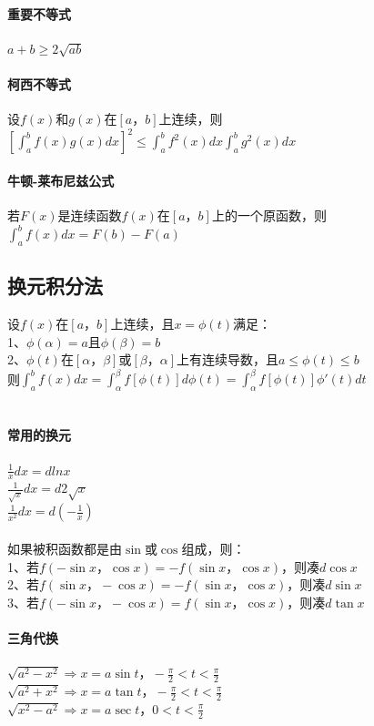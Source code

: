 \documentclass{article}
\begin{document}
\begin{flushleft}
	\paragraph{重要不等式}
	$a+b\ge 2\sqrt{ab}$\\
	\paragraph{柯西不等式}
	设$f(x)$和$g(x)$在$[a，b]$上连续，则$[\int_{a}^{b}f(x)g(x)dx]^2\le \int_{a}^{b}f^2(x)dx\int_{a}^{b}g^2(x)dx$\\
	\paragraph{牛顿-莱布尼兹公式}
	若$F(x)$是连续函数$f(x)$在$[a，b]$上的一个原函数，则$\int_{a}^{b}f(x)dx=F(b)-F(a)$\\
	
	\subsection{换元积分法}
	
	设$f(x)$在$[a，b]$上连续，且$x=\phi(t)$满足：\\
	1、$\phi(\alpha)=a$且$\phi(\beta)=b$\\
	2、$\phi(t)$在$[\alpha，\beta]$或$[\beta，\alpha]$上有连续导数，且$a\le \phi(t)\le b$\\
	则$\int_{a}^{b}f(x)dx=\int_{\alpha}^{\beta}f[\phi(t)]d\phi(t)=\int_{\alpha}^{\beta}f[\phi(t)]\phi'(t)dt$\\
	~\\
	\paragraph{常用的换元}
	$\frac{1}{x}dx=dlnx$\\
	$\frac{1}{\sqrt{x}}dx=d2\sqrt{x}$\\
	$\frac{1}{x^2}dx=d(-\frac{1}{x})$\\
	~\\
	如果被积函数都是由$\sin$或$\cos$组成，则：\\
	1、若$f(-\sin x，\cos x)=-f(\sin x，\cos x)$，则凑$d\cos x$\\
	2、若$f(\sin x，-\cos x)=-f(\sin x，\cos x)$，则凑$d\sin x$\\
	3、若$f(-\sin x，-\cos x)=f(\sin x，\cos x)$，则凑$d\tan x$\\
	\paragraph{三角代换}
	$\sqrt{a^2-x^2} \Rightarrow x=a\sin t， -\frac{\pi}{2}<t<\frac{\pi}{2}$\\
	$\sqrt{a^2+x^2} \Rightarrow x=a\tan t， -\frac{\pi}{2}<t<\frac{\pi}{2}$\\
	$\sqrt{x^2-a^2} \Rightarrow x=a\sec t， 0<t<\frac{\pi}{2}$\\

\end{flushleft}
\end{document}
